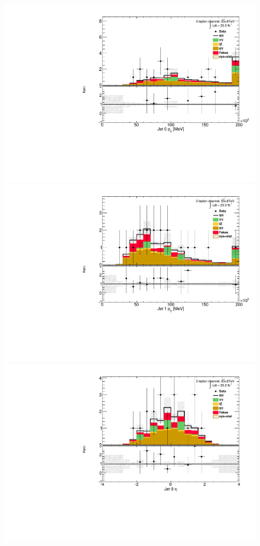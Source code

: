 \begin{figure}[!htbp]
  \begin{minipage}[h]{0.5\textwidth}
    \centering \includegraphics[width=\textwidth]{figs/results/plotCand_3lep_Jet0Pt}
  \end{minipage}\hfill
  \begin{minipage}[h]{0.5\textwidth}
    \centering \includegraphics[width=\textwidth]{figs/results/plotCand_3lep_Jet1Pt}
  \end{minipage}\hfill
  \begin{minipage}[h]{0.5\textwidth}
    \centering \includegraphics[width=\textwidth]{figs/results/plotCand_3lep_Jet0Eta}

\end{minipage}
\end{figure}
